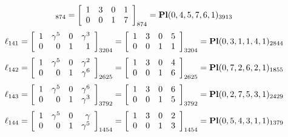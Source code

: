 \documentclass{article}
\begin{document}
{$$_{874}
=
\left[
\begin{array}{*{4}c}
1  & 3  & 0  & 1\\
0  & 0  & 1  & 7\\
\end{array}
\right]_{874}
={\rm\bf Pl}(0,4,5,7,6,1 )_{3913}$$
$$
\ell_{141} = 
\left[
\begin{array}{*{4}{r}}
1 & \gamma^{5} & 0 & \gamma^{3}\\
0 & 0 & 1 & 1\\
\end{array}
\right]
_{3204}
=
\left[
\begin{array}{*{4}c}
1  & 3  & 0  & 5\\
0  & 0  & 1  & 1\\
\end{array}
\right]_{3204}
={\rm\bf Pl}(0,3,1,1,4,1 )_{2844}$$
$$
\ell_{142} = 
\left[
\begin{array}{*{4}{r}}
1 & \gamma^{5} & 0 & \gamma^{2}\\
0 & 0 & 1 & \gamma^{6}\\
\end{array}
\right]
_{2625}
=
\left[
\begin{array}{*{4}c}
1  & 3  & 0  & 4\\
0  & 0  & 1  & 6\\
\end{array}
\right]_{2625}
={\rm\bf Pl}(0,7,2,6,2,1 )_{1855}$$
$$
\ell_{143} = 
\left[
\begin{array}{*{4}{r}}
1 & \gamma^{5} & 0 & \gamma^{6}\\
0 & 0 & 1 & \gamma^{3}\\
\end{array}
\right]
_{3792}
=
\left[
\begin{array}{*{4}c}
1  & 3  & 0  & 6\\
0  & 0  & 1  & 5\\
\end{array}
\right]_{3792}
={\rm\bf Pl}(0,2,7,5,3,1 )_{2429}$$
$$
\ell_{144} = 
\left[
\begin{array}{*{4}{r}}
1 & \gamma^{5} & 0 & \gamma \\
0 & 0 & 1 & \gamma^{5}\\
\end{array}
\right]
_{1454}
=
\left[
\begin{array}{*{4}c}
1  & 3  & 0  & 2\\
0  & 0  & 1  & 3\\
\end{array}
\right]_{1454}
={\rm\bf Pl}(0,5,4,3,1,1 )_{1379}$$
}
\end{document}
